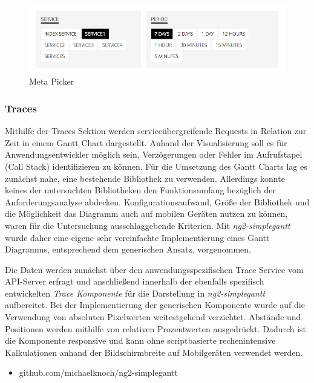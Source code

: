 


\begin{figure}[hptb]
 \centering
 \includegraphics[width=0.8\linewidth]{kapitel4/metapicker.jpg}
 \caption{Meta Picker}
 \label{metapicker}
\end{figure}
\vspace{0.3cm}


\subsubsection{Traces}

Mithilfe der Traces Sektion werden serviceübergreifende Requests in Relation zur Zeit in einem Gantt Chart dargestellt.
Anhand der Visualisierung soll es für Anwendungsentwickler möglich sein, Verzögerungen oder Fehler im Aufrufstapel (Call Stack) identifizieren zu können.
Für die Umsetzung des Gantt Charts lag es zunächst nahe, eine bestehende Bibliothek zu verwenden.
Allerdings konnte keines der untersuchten Bibliotheken den Funktionsumfang bezüglich der Anforderungsanalyse abdecken.
Konfigurationsaufwand, Größe der Bibliothek und die Möglichkeit das Diagramm auch auf mobilen Geräten nutzen zu können, waren für die Untersuchung ausschlaggebende Kriterien.
Mit \emph{ng2-simplegantt} wurde daher eine eigene sehr vereinfachte Implementierung eines Gantt Diagramms, entsprechend dem generischen Ansatz, vorgenommen.

Die Daten werden zunächst über den anwendungsspezifischen Trace Service vom API-Server erfragt und anschließend innerhalb der ebenfalls spezifisch entwickelten \emph{Trace Komponente}
für die Darstellung in \emph{ng2-simplegantt} aufbereitet.
Bei der Implementierung der generischen Komponente wurde auf die Verwendung von absoluten Pixelwerten weitestgehend verzichtet.
Abstände und Positionen werden mithilfe von relativen Prozentwerten ausgedrückt. Dadurch ist die Komponente responsive und kann
ohne scriptbasierte rechenintensive Kalkulationen anhand der Bildschirmbreite auf Mobilgeräten verwendet werden.

\begin{itemize}
  \item{github.com/michaelknoch/ng2-simplegantt}
\end{itemize}

